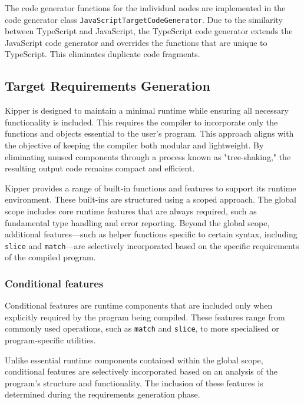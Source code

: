 The code generator functions for the individual nodes are implemented in the code generator class \lstinline|JavaScriptTargetCodeGenerator|. Due to the similarity between TypeScript and JavaScript, the TypeScript code generator extends the JavaScript code generator and overrides the functions that are unique to TypeScript. This eliminates duplicate code fragments.

\subsection{Target Requirements Generation}
\label{sec:requirements-generation}

Kipper is designed to maintain a minimal runtime while ensuring all necessary functionality is included. This requires the compiler to incorporate only the functions and objects essential to the user's program. This approach aligns with the objective of keeping the compiler both modular and lightweight. By eliminating unused components through a process known as "tree-shaking," the resulting output code remains compact and efficient.

Kipper provides a range of built-in functions and features to support its runtime environment. These built-ins are structured using a scoped approach. The global scope includes core runtime features that are always required, such as fundamental type handling and error reporting. Beyond the global scope, additional features—such as helper functions specific to certain syntax, including \lstinline|slice| and \lstinline|match|—are selectively incorporated based on the specific requirements of the compiled program.

\subsubsection{Conditional features}
\label{sec:conditional-features}

Conditional features are runtime components that are included only when explicitly required by the program being compiled. These features range from commonly used operations, such as \lstinline|match| and \lstinline|slice|, to more specialised or program-specific utilities.

Unlike essential runtime components contained within the global scope, conditional features are selectively incorporated based on an analysis of the program's structure and functionality. The inclusion of these features is determined during the requirements generation phase.

